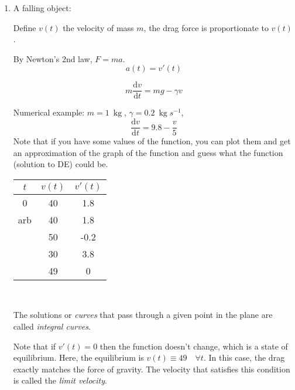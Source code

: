 \documentclass{article}
\newcommand{\mathd}{\mathrm{d}}
\newcommand{\tmem}[1]{{\em #1\/}}
\newcommand{\tmop}[1]{\ensuremath{\operatorname{#1}}}
\begin{document}
\begin{enumerate}
  \item A falling object:
  
  \begin{center}
  \end{center}
  
  Define $v (t)$ the velocity of mass $m$, the drag force is proportionate to
  $v (t)$.
  
  By Newton's 2nd law, $F = ma$.
  \[ a (t) = v' (t) \]
  \begin{tmframed}
    \[ m \frac{\mathd v}{\mathd t} = mg - \gamma v \]
  \end{tmframed}
  
  Numerical example: $m = \SI{1}{\tmop{kg}}$, $\gamma =
  \SI{0.2}{\tmop{kg}}{s^{- 1}}$,
  \[ \frac{\mathd v}{\mathd t} = 9.8 - \frac{v}{5} \]
  Note that if you have some values of the function, you can plot them and get
  an approximation of the graph of the function and guess what the function
  (solution to DE) could be.
  
  
  \begin{center}
    \begin{tabular}{|c|c|c|}
      \hline
      $t$ & $v (t)$ & $v' (t)$\\
      \hline
      0 & 40 & 1.8\\
      \hline
      arb & 40 & 1.8\\
      \hline
      & 50 & -0.2\\
      \hline
      & 30 & 3.8\\
      \hline
      & 49 & 0\\
      \hline
    \end{tabular}
    
    \ 
  \end{center}
  
  \begin{center}
  \end{center}
  
  The solutions or {\tmem{curves}} that pass through a given point in the
  plane are called {\tmem{integral curves}}.
  
  Note that if $v' (t) = 0$ then the function doesn't change, which is a state
  of equilibrium. Here, the equilibrium is $v (t) \equiv 49 \quad \forall t$.
  In this case, the drag exactly matches the force of gravity. The velocity
  that satisfies this condition is called the {\tmem{limit velocity}}.
  

\end{enumerate}
\end{document}
